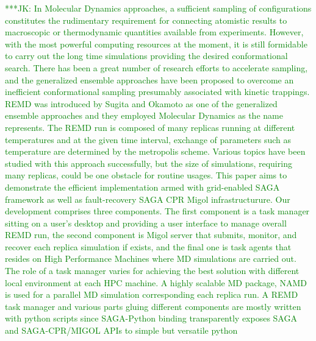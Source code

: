 \documentclass[times, 10pt,twocolumn]{article}
\newcommand{\kimnote}[1]{ {\textcolor{green} { ***JK: #1 }}}
\begin{document}
\kimnote{In Molecular Dynamics approaches, a sufficient sampling of configurations constitutes the rudimentary requirement for connecting atomistic results to macroscopic or thermodynamic quantities available from experiments.   However,  with the most powerful computing resources at the moment, it is still formidable to carry out the long time simulations providing the desired conformational search.   There has been a great number of research efforts to accelerate sampling, and the generalized ensemble approaches have been proposed to overcome an inefficient conformational sampling presumably associated with kinetic trappings.  REMD was introduced by Sugita and Okamoto as one of the generalized ensemble approaches and they employed Molecular Dynamics as the name represents.  The REMD run is composed of many replicas running at different temperatures and at the given time interval, exchange of parameters such as temperature are determined by the metropolis scheme.  Various topics have been studied with this approach successfully, but the size of simulations, requiring many replicas, could be one obstacle for routine usages.  This paper aims to demonstrate the efficient implementation armed with grid-enabled SAGA framework as well as fault-recovery SAGA CPR Migol infrastructurure.  Our development comprises three components.  The first component is a task manager sitting on a user's desktop and providing a user interface to manage overall REMD run, the second component is Migol server that submits, monitor, and recover each replica simulation if exists, and the final one is task agents that resides on High Performance Machines where MD simulations are carried out.  The role of a task manager varies for achieving the best solution with different local environment at each HPC machine.  A highly scalable MD package, NAMD is used for a parallel MD simulation corresponding each replica run.  A REMD task manager and various parts gluing different components are mostly written with python scripts since SAGA-Python binding transparently exposes SAGA and SAGA-CPR/MIGOL APIs to simple but versatile python} 

\label{sec:migol}
\end{document}
